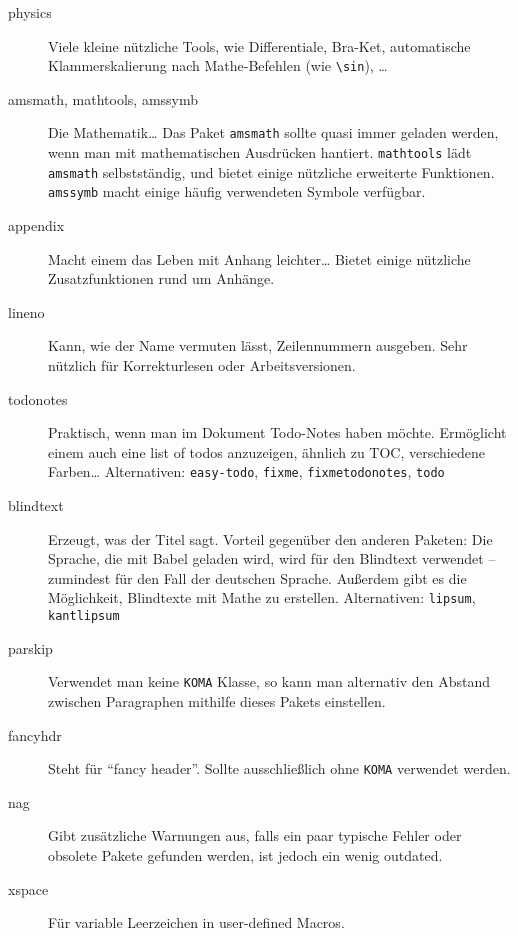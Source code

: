 \documentclass[11pt,
               a4paper,
               parskip=half,
               ]{scrartcl}
\newcommand{\textsw}[1]{\texttt{#1}} %
\begin{document}
\begin{description}
  \item[physics] Viele kleine nützliche Tools,
    wie Differentiale, Bra-Ket,
    automatische Klammerskalierung nach Mathe-Befehlen
    (wie \verb+\sin+), \dots

  \item[amsmath, mathtools, amssymb] Die Mathematik\dots
    Das Paket \textsw{amsmath} sollte quasi immer geladen werden,
    wenn man mit mathematischen Ausdrücken hantiert.
    \textsw{mathtools} lädt \textsw{amsmath} selbstständig,
    und bietet einige nützliche erweiterte Funktionen.
    \textsw{amssymb} macht einige häufig verwendeten Symbole verfügbar.

  \item[appendix] Macht einem das Leben mit Anhang leichter\dots
    Bietet einige nützliche Zusatzfunktionen rund um Anhänge.

  \item[lineno] Kann, wie der Name vermuten lässt, Zeilennummern ausgeben.
    Sehr nützlich für Korrekturlesen oder Arbeitsversionen.

  \item[todonotes] Praktisch, wenn man im Dokument Todo-Notes haben möchte.
    Ermöglicht einem auch eine list of todos anzuzeigen, ähnlich zu TOC,
    verschiedene Farben\dots
    Alternativen: \textsw{easy-todo}, \textsw{fixme},
      \textsw{fixmetodonotes}, \textsw{todo}

  \item[blindtext] Erzeugt, was der Titel sagt.
    Vorteil gegenüber den anderen Paketen:
    Die Sprache, die mit Babel geladen wird,
    wird für den Blindtext verwendet --
    zumindest für den Fall der deutschen Sprache.
    Außerdem gibt es die Möglichkeit,
    Blindtexte mit Mathe zu erstellen.
    Alternativen: \textsw{lipsum}, \textsw{kantlipsum}

  \item[parskip] Verwendet man keine \textsw{KOMA} Klasse,
    so kann man alternativ den Abstand
    zwischen Paragraphen mithilfe dieses Pakets einstellen.

  \item[fancyhdr] Steht für \enquote{fancy header}.
    Sollte ausschließlich ohne \textsw{KOMA} verwendet werden.

  \item[nag] Gibt zusätzliche Warnungen aus,
    falls ein paar typische Fehler oder obsolete
    Pakete gefunden werden, ist jedoch ein wenig outdated.

  \item[xspace] Für variable Leerzeichen in user-defined Macros.


\end{description}
\end{document}
